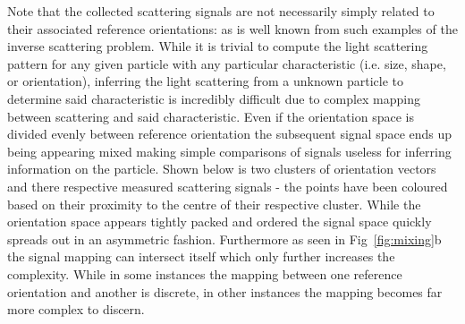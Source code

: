Note that the collected scattering signals are not necessarily simply related to 
their associated reference orientations: as is well known from such examples of 
the inverse scattering problem. While it is trivial to compute the light scattering 
pattern for any given particle with any particular characteristic (i.e. size, 
shape, or orientation), inferring the light scattering from a unknown particle 
to determine said characteristic is incredibly difficult due to complex mapping 
between scattering and said characteristic. Even if the orientation space is divided 
evenly between reference orientation the subsequent signal space ends up being 
appearing mixed making simple comparisons of signals useless for inferring information 
on the particle. Shown below is two clusters of orientation vectors and there 
respective measured scattering signals - the points have been coloured based on 
their proximity to the centre of their respective cluster. While the orientation 
space appears tightly packed and ordered the signal space quickly spreads out in 
an asymmetric fashion. Furthermore as seen in Fig~\ref{fig:mixing}b the signal 
mapping can intersect itself which only further increases the complexity. While 
in some instances the mapping between one reference orientation and another is 
discrete, in other instances the mapping becomes far more complex to discern. 

